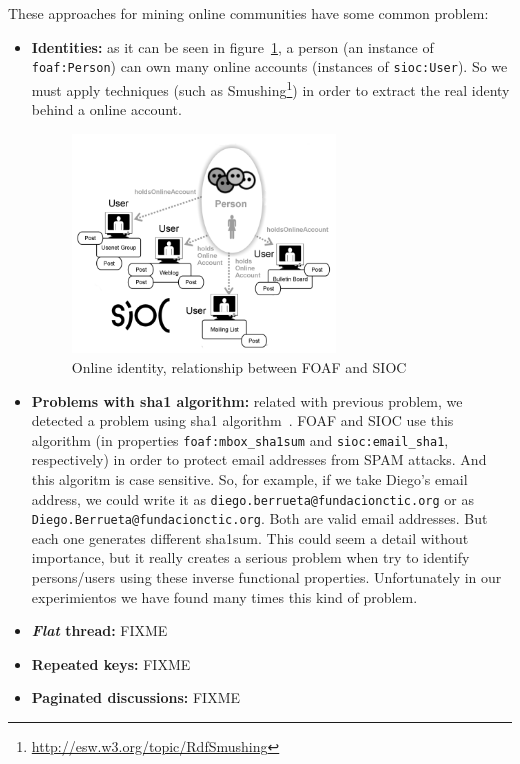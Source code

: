 \documentclass{../templates/www2008-submission}
\begin{document}
These approaches for mining online communities have some common problem:

\begin{itemize}
  \item \textbf{Identities:} as it can be seen in figure~\ref{fig:foaf-sioc},
	a person (an instance of \texttt{foaf:Person}) can own many online 
	accounts (instances of \texttt{sioc:User}). So we must apply techniques
	(such as Smushing\footnote{\url{http://esw.w3.org/topic/RdfSmushing}})
	in order to extract the real identy behind a online account.

	\begin{figure}[ht]
	 \centering
	 \includegraphics[width=7cm]{images/foaf-sioc.png}
	 \caption{\label{fig:foaf-sioc}Online identity, relationship between FOAF and SIOC}
	\end{figure}

  \item \textbf{Problems with sha1 algorithm:} related with previous problem,
	we detected a problem using sha1 algorithm~\cite{Eastlake2001}. FOAF 
	and SIOC use this algorithm (in properties \texttt{foaf:mbox\_sha1sum} 
	and \texttt{sioc:email\_sha1}, respectively) in order to protect email 
	addresses from SPAM attacks. And this algoritm is case sensitive. So,
	for example, if we take Diego's email address, we could write it as
	\texttt{diego.berrueta@fundacionctic.org} or as \texttt{Diego.Berrueta@fundacionctic.org}.
	Both are valid email addresses. But each one generates different sha1sum.
	This could  seem a detail without importance, but it really creates a 
	serious problem when try to identify persons/users using these
	inverse functional properties. Unfortunately in our experimientos we 
	have found many times this kind of problem.

  \item \textbf{\textit{Flat} thread:} FIXME

  \item \textbf{Repeated keys:} FIXME

  \item \textbf{Paginated discussions:} FIXME


\end{itemize}
\end{document}

